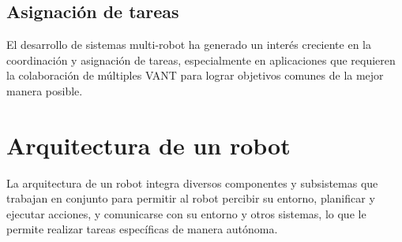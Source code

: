 \subsection{Asignación de tareas}

El desarrollo de sistemas multi-robot ha generado un interés creciente en la coordinación y asignación de tareas, especialmente en aplicaciones que requieren la colaboración de múltiples VANT para lograr objetivos comunes de la mejor manera posible.


\section{Arquitectura de un robot}

La arquitectura de un robot integra diversos componentes y subsistemas que trabajan en conjunto para permitir al robot percibir su entorno, planificar y ejecutar acciones, y comunicarse con su entorno y otros sistemas, lo que le permite realizar tareas específicas de manera autónoma.

